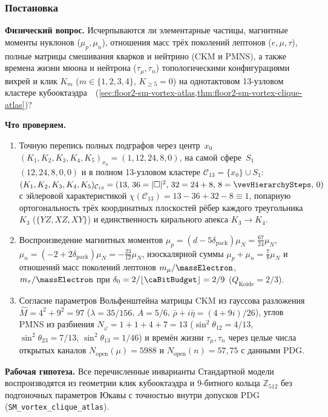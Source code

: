 \label{exp:cef04}

\subsubsection*{Постановка}
\textbf{Физический вопрос.}
Исчерпываются ли элементарные частицы, магнитные моменты нуклонов ($\mu_p, \mu_n$), отношения масс трёх поколений лептонов ($e,\mu,\tau$), полные матрицы смешивания кварков и нейтрино (CKM и PMNS), а также времена жизни мюона и нейтрона ($\tau_\mu, \tau_n$) топологическими конфигурациями вихрей и клик $K_m$ ($m \in \{1,2,3,4\}$, $K_{\ge 5}=0$) на однотактовом 13-узловом кластере кубооктаэдра~\latGCKshort\ (\cref{sec:floor2-sm-vortex-atlas,thm:floor2-sm-vortex-clique-atlas})?

\textbf{Что проверяем.}
\begin{enumerate}[label=\textbf{(\alph*)},leftmargin=*,itemsep=0.25em]
\item Точную перепись полных подграфов через центр~$x_0$ $(K_1,K_2,K_3,K_4,K_5)_{x_0} = (1,12,24,8,0)$, на самой сфере~$S_1$ $(12,24,8,0,0)$ и в полном 13-узловом кластере $\mathcal{C}_{13} = \{x_0\}\cup S_1$: $(K_1,K_2,K_3,K_4,K_5)_{\mathcal{C}_{13}} = (13,\,36=|\square|^2,\,32=24+8,\,8=\vevHierarchySteps,\,0)$ с эйлеровой характеристикой $\chi(\mathcal{C}_{13}) = 13 - 36 + 32 - 8 \equiv 1$, попарную ортогональность трёх координатных плоскостей рёбер каждого треугольника~$K_3$ ($\{YZ,XZ,XY\}$) и единственность кирального апекса $K_3\to K_4$.
\item Воспроизведение магнитных моментов $\mu_p = (d - 5\delta_{\mathrm{pack}})\mu_N = \frac{67}{24}\mu_N$, $\mu_n = (-2 + 2\delta_{\mathrm{pack}})\mu_N = -\frac{23}{12}\mu_N$, изоскалярной суммы $\mu_p+\mu_n = \frac{7}{8}\mu_N$ и отношений масс поколений лептонов $m_\mu/\massElectron$, $m_\tau/\massElectron$ при $\delta_0 = 2/\lfloor\caBitBudget\rfloor = 2/9$ ($Q_{\mathrm{Koide}} = 2/3$).
\item Согласие параметров Вольфенштейна матрицы CKM из гауссова разложения $\hat M = 4^2+9^2 = 97$ ($\lambda=35/156$, $A=5/6$, $\bar\rho+i\bar\eta=(4+9i)/26$), углов PMNS из разбиения $N_\varphi = 1+1+4+7 = 13$ ($\sin^2\theta_{12}=4/13$, $\sin^2\theta_{23}=7/13$, $\sin^2\theta_{13}=1/46$) и времён жизни $\tau_\mu, \tau_n$ через целые числа открытых каналов $N_{\mathrm{open}}(\mu)=5988$ и $N_{\mathrm{open}}(n)=57{,}75$ с данными PDG.
\end{enumerate}

{\sloppy\textbf{Рабочая гипотеза.}
Все перечисленные инварианты Стандартной модели воспроизводятся из геометрии клик кубооктаэдра и 9-битного кольца $\mathbb{Z}_{512}$ без подгоночных параметров Юкавы с точностью внутри допусков PDG (\texttt{SM\_vortex\_clique\_atlas}).\par}

